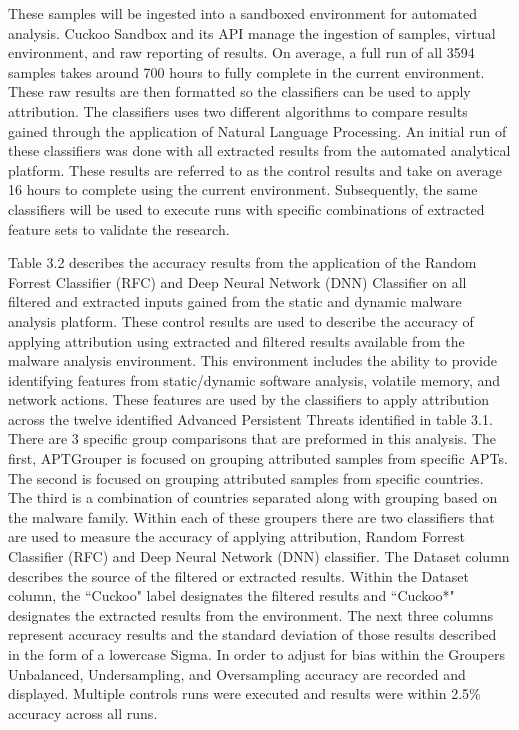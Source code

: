 \documentclass[12pt]{report}
\begin{document}
These samples will be ingested into a sandboxed environment for automated analysis.  Cuckoo Sandbox and its API manage the ingestion of samples, virtual environment, and raw reporting of results.  On average, a full run of all 3594 samples takes around 700 hours to fully complete in the current environment.  These raw results are then formatted so the classifiers can be used to apply attribution.  The classifiers uses two different algorithms to compare results gained through the application of Natural Language Processing.  An initial run of these classifiers was done with all extracted results from the automated analytical platform.  These results are referred to as the control results and take on average 16 hours to complete using the current environment.  Subsequently, the same classifiers will be used to execute runs with specific combinations of extracted feature sets to validate the research. 

Table 3.2 describes the accuracy results from the application of the Random Forrest Classifier (RFC) and Deep Neural Network (DNN) Classifier on all filtered and extracted inputs gained from the static and dynamic malware analysis platform.  These control results are used to describe the accuracy of applying attribution using extracted and filtered results available from the malware analysis environment.  This environment includes the ability to provide identifying features from static/dynamic software analysis, volatile memory, and network actions.  These features are used by the classifiers to apply attribution across the twelve identified Advanced Persistent Threats identified in table 3.1.  There are 3 specific group comparisons that are preformed in this analysis.  The first, APTGrouper is focused on grouping attributed samples from specific APTs.  The second is focused on grouping attributed samples from specific countries.  The third is a combination of countries separated along with grouping based on the malware family.  Within each of these groupers there are two classifiers that are used to measure the accuracy of applying attribution, Random Forrest Classifier (RFC) and Deep Neural Network (DNN) classifier.  The Dataset column describes the source of the filtered or extracted results.  Within the Dataset column, the ``Cuckoo" label designates the filtered results and ``Cuckoo*" designates the extracted results from the environment.  The next three columns represent accuracy results and the standard deviation of those results described in the form of a lowercase Sigma.  In order to adjust for bias within the Groupers Unbalanced, Undersampling, and Oversampling accuracy are recorded and displayed.  Multiple controls runs were executed and results were within 2.5\% accuracy across all runs.
\end{document}
